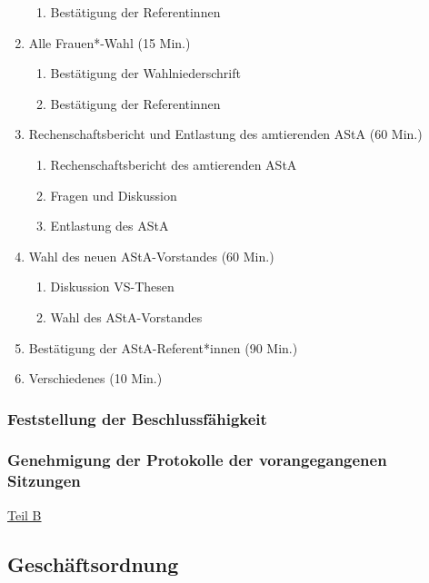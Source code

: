 \documentclass[ngerman,headheight=70pt]{scrartcl}
\begin{document}
\begin{enumerate}[label={\textbf{Top \theenumi}},leftmargin=*]
\begin{enumerate}
                \item Bestätigung der Referentinnen
            \end{enumerate}
        \item Alle Frauen*-Wahl (15 Min.)
            \begin{enumerate}
                \item Bestätigung der Wahlniederschrift
                \item Bestätigung der Referentinnen
            \end{enumerate}
        \item Rechenschaftsbericht und Entlastung des amtierenden AStA (60 Min.)
            \begin{enumerate}
                \item Rechenschaftsbericht des amtierenden AStA
                \item Fragen und Diskussion
                \item Entlastung des AStA
              \end{enumerate}
        \item Wahl des neuen AStA-Vorstandes (60 Min.)
            \begin{enumerate}
                \item Diskussion VS-Thesen
                \item Wahl des AStA-Vorstandes
            \end{enumerate}
        \item Bestätigung der AStA-Referent*innen (90 Min.)
        \item Verschiedenes (10 Min.)
    \end{enumerate}

    \subsubsection{Feststellung der Beschlussfähigkeit}

    \subsubsection{Genehmigung der Protokolle der vorangegangenen Sitzungen}


    \vspace{0.5cm}
    {\Large \underline{Teil B}}

    \subsection{Geschäftsordnung}
\end{document}
